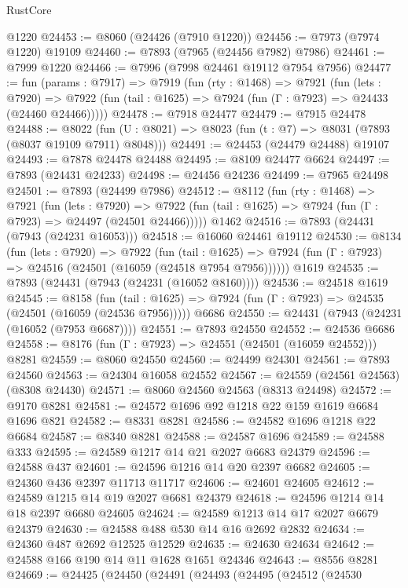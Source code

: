 \begin{lexlean}{RustCore}
\begin{coremodule}
    @1220
@24453 := @8060 (@24426 (@7910 @1220))
@24456 := @7973 (@7974 @1220) @19109
@24460 := @7893 (@7965 (@24456 @7982) @7986)
@24461 := @7999 @1220
@24466 := @7996 (@7998 @24461 @19112 @7954 @7956)
@24477 := fun (params : @7917) =>
  @7919
    (fun (rty : @1468) =>
    @7921
      (fun (lets : @7920) =>
      @7922 (fun (tail : @1625) => @7924 (fun (Γ : @7923) => @24433 (@24460 @24466)))))
@24478 := @7918 @24477
@24479 := @7915 @24478
@24488 := @8022
    (fun (U : @8021) => @8023 (fun (t : @7) => @8031 (@7893 (@8037 @19109 @7911) @8048)))
@24491 := @24453 (@24479 @24488) @19107
@24493 := @7878 @24478 @24488
@24495 := @8109 @24477 @6624
@24497 := @7893 (@24431 @24233)
@24498 := @24456 @24236
@24499 := @7965 @24498
@24501 := @7893 (@24499 @7986)
@24512 := @8112
    (fun (rty : @1468) =>
    @7921
      (fun (lets : @7920) =>
      @7922 (fun (tail : @1625) => @7924 (fun (Γ : @7923) => @24497 (@24501 @24466)))))
    @1462
@24516 := @7893 (@24431 (@7943 (@24231 @16053)))
@24518 := @16060 @24461 @19112
@24530 := @8134
    (fun (lets : @7920) =>
    @7922
      (fun (tail : @1625) =>
      @7924 (fun (Γ : @7923) => @24516 (@24501 (@16059 (@24518 @7954 @7956))))))
    @1619
@24535 := @7893 (@24431 (@7943 (@24231 (@16052 @8160))))
@24536 := @24518 @1619
@24545 := @8158
    (fun (tail : @1625) => @7924 (fun (Γ : @7923) => @24535 (@24501 (@16059 (@24536 @7956)))))
    @6686
@24550 := @24431 (@7943 (@24231 (@16052 (@7953 @6687))))
@24551 := @7893 @24550
@24552 := @24536 @6686
@24558 := @8176 (fun (Γ : @7923) => @24551 (@24501 (@16059 @24552))) @8281
@24559 := @8060 @24550
@24560 := @24499 @24301
@24561 := @7893 @24560
@24563 := @24304 @16058 @24552
@24567 := @24559 (@24561 @24563) (@8308 @24430)
@24571 := @8060 @24560 @24563 (@8313 @24498)
@24572 := @9170 @8281
@24581 := @24572 @1696 @92 @1218 @22 @159 @1619 @6684 @1696 @821
@24582 := @8331 @8281
@24586 := @24582 @1696 @1218 @22 @6684
@24587 := @8340 @8281
@24588 := @24587 @1696
@24589 := @24588 @333
@24595 := @24589 @1217 @14 @21 @2027 @6683 @24379
@24596 := @24588 @437
@24601 := @24596 @1216 @14 @20 @2397 @6682
@24605 := @24360 @436 @2397 @11713 @11717
@24606 := @24601 @24605
@24612 := @24589 @1215 @14 @19 @2027 @6681 @24379
@24618 := @24596 @1214 @14 @18 @2397 @6680 @24605
@24624 := @24589 @1213 @14 @17 @2027 @6679 @24379
@24630 := @24588 @488 @530 @14 @16 @2692 @2832
@24634 := @24360 @487 @2692 @12525 @12529
@24635 := @24630 @24634
@24642 := @24588 @166 @190 @14 @11 @1628 @1651 @24346
@24643 := @8556 @8281
@24669 := @24425
    (@24450
      (@24491
        (@24493
          (@24495
            (@24512
              (@24530

\end{coremodule}
\end{lexlean}
